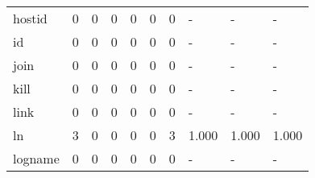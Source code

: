 \begin{longtable}{lp{2.0cm}p{2.0cm}p{2.0cm}p{2.0cm}p{2.0cm}p{2.0cm}p{2.0cm}p{2.0cm}p{2.0cm}}
hostid    &                      0 &                                             0 &                                            0 &                                           0 &                                            0 &                                          0 &                                    - &                                      - &                                    - \\
id        &                      0 &                                             0 &                                            0 &                                           0 &                                            0 &                                          0 &                                    - &                                      - &                                    - \\
join      &                      0 &                                             0 &                                            0 &                                           0 &                                            0 &                                          0 &                                    - &                                      - &                                    - \\
kill      &                      0 &                                             0 &                                            0 &                                           0 &                                            0 &                                          0 &                                    - &                                      - &                                    - \\
link      &                      0 &                                             0 &                                            0 &                                           0 &                                            0 &                                          0 &                                    - &                                      - &                                    - \\
ln        &                      3 &                                             0 &                                            0 &                                           0 &                                            0 &                                          3 &                                1.000 &                                  1.000 &                                1.000 \\
logname   &                      0 &                                             0 &                                            0 &                                           0 &                                            0 &                                          0 &                                    - &                                      - &                                    - \\

\end{longtable}
